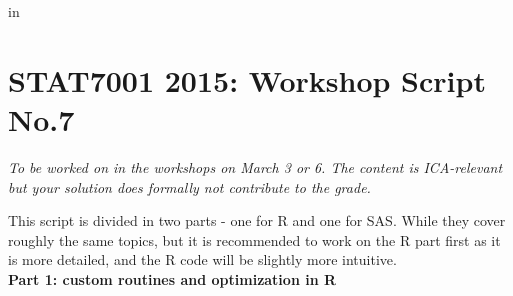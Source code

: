 
\topmargin   -3cm
\textwidth   6.2in
 in



\section*{STAT7001 2015: Workshop Script No.7}
{\em To be worked on in the workshops on March 3 or 6. The content is ICA-relevant but your solution does formally not contribute to the grade.}

This script is divided in two parts - one for R and one for SAS. While they cover roughly the same topics, but it is recommended to work on the R part first as it is more detailed, and the R code will be slightly more intuitive.\\


{\Large \bf Part 1: custom routines and optimization in R}
